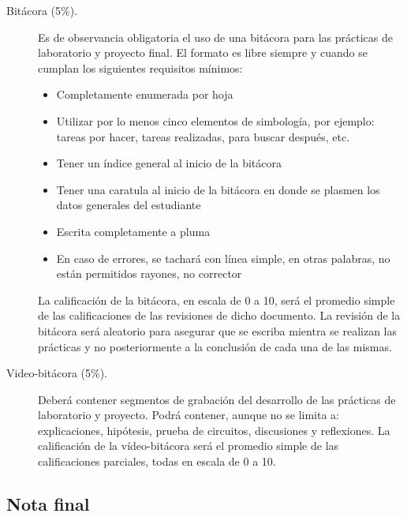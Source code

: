 \documentclass[letterpaper, 11pt]{article}
\begin{document}
\begin{description}
  	  \item [Bitácora (5\%).] Es de observancia obligatoria el uso de una bitácora para las prácticas de laboratorio y proyecto final. El formato es libre siempre y cuando se cumplan los siguientes requisitos mínimos:
      \begin{itemize}
        \item Completamente enumerada por hoja
        \item Utilizar por lo menos cinco elementos de simbología, por ejemplo: tareas por hacer, tareas realizadas, para buscar después, etc.
        \item Tener un índice general al inicio de la bitácora
        \item Tener una caratula al inicio de la bitácora en donde se plasmen los datos generales del estudiante
        \item Escrita completamente a pluma
        \item En caso de errores, se tachará con línea simple, en otras palabras, no están permitidos rayones, no corrector
      \end{itemize}
      La calificación de la bitácora, en escala de 0 a 10, será el promedio simple de las calificaciones de las revisiones de dicho documento. La revisión de la bitácora será aleatorio para asegurar que se escriba mientra se realizan las prácticas y no posteriormente a la conclusión de cada una de las mismas.
     \item [Video-bitácora (5\%).] Deberá contener segmentos de grabación del desarrollo de las prácticas de laboratorio y proyecto. Podrá contener, aunque no se limita a: explicaciones, hipótesis, prueba de circuitos, discusiones y reflexiones. La calificación de la vídeo-bitácora será el promedio simple de las calificaciones parciales, todas en escala de 0 a 10.
  	\end{description}

	\subsection{Nota final}
\end{document}

